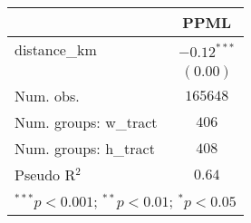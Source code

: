 
\begin{tabular}{l c}
\hline
 & PPML \\
\hline
distance\_km          & $-0.12^{***}$ \\
                      & $(0.00)$      \\
\hline
Num. obs.             & $165648$      \\
Num. groups: w\_tract & $406$         \\
Num. groups: h\_tract & $408$         \\
Pseudo R$^2$          & $0.64$        \\
\hline
\multicolumn{2}{l}{\scriptsize{$^{***}p<0.001$; $^{**}p<0.01$; $^{*}p<0.05$}}
\end{tabular}
